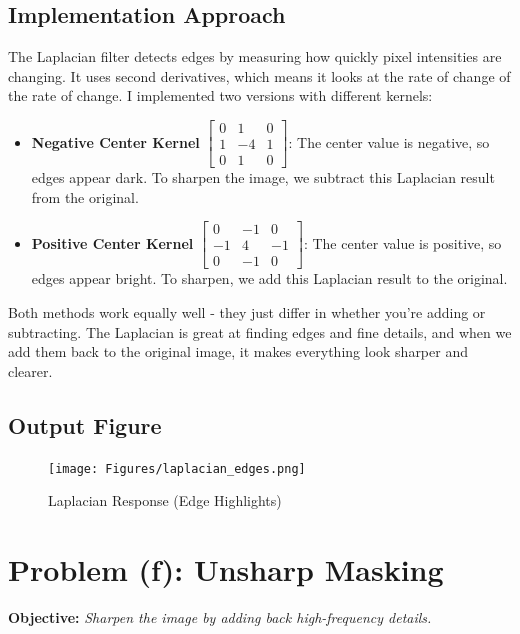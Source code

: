 \documentclass[12pt,a4paper]{report}
\begin{document}
\subsection{Implementation Approach}
The Laplacian filter detects edges by measuring how quickly pixel intensities are changing. It uses second derivatives, which means it looks at the rate of change of the rate of change. I implemented two versions with different kernels:

\begin{itemize}
    \item \textbf{Negative Center Kernel} \(\begin{bmatrix}0&1&0\\1&-4&1\\0&1&0\end{bmatrix}\): The center value is negative, so edges appear dark. To sharpen the image, we subtract this Laplacian result from the original.
    \item \textbf{Positive Center Kernel} \(\begin{bmatrix}0&-1&0\\-1&4&-1\\0&-1&0\end{bmatrix}\): The center value is positive, so edges appear bright. To sharpen, we add this Laplacian result to the original.
\end{itemize}

Both methods work equally well - they just differ in whether you're adding or subtracting. The Laplacian is great at finding edges and fine details, and when we add them back to the original image, it makes everything look sharper and clearer.

\subsection{Output Figure}
\begin{figure}[H]
\centering
\texttt{[image: Figures/laplacian\_edges.png]}
\caption{Laplacian Response (Edge Highlights)}
\end{figure}

\section{Problem (f): Unsharp Masking}
\textbf{Objective:} \textit{Sharpen the image by adding back high-frequency details.}
\end{document}
